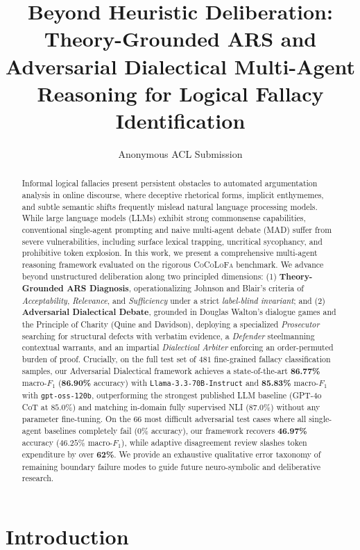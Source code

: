 \documentclass[11pt]{article}
\title{Beyond Heuristic Deliberation: Theory-Grounded ARS and Adversarial Dialectical Multi-Agent Reasoning for Logical Fallacy Identification}
\author{Anonymous ACL Submission}
\begin{document}
\maketitle

\begin{abstract}
Informal logical fallacies present persistent obstacles to automated argumentation analysis in online discourse, where deceptive rhetorical forms, implicit enthymemes, and subtle semantic shifts frequently mislead natural language processing models. While large language models (LLMs) exhibit strong commonsense capabilities, conventional single-agent prompting and naive multi-agent debate (MAD) suffer from severe vulnerabilities, including surface lexical trapping, uncritical sycophancy, and prohibitive token explosion. In this work, we present a comprehensive multi-agent reasoning framework evaluated on the rigorous \textsc{CoCoLoFa} benchmark. We advance beyond unstructured deliberation along two principled dimensions: (1) \textbf{Theory-Grounded ARS Diagnosis}, operationalizing Johnson and Blair's criteria of \textit{Acceptability}, \textit{Relevance}, and \textit{Sufficiency} under a strict \textit{label-blind invariant}; and (2) \textbf{Adversarial Dialectical Debate}, grounded in Douglas Walton's dialogue games and the Principle of Charity (Quine and Davidson), deploying a specialized \textit{Prosecutor} searching for structural defects with verbatim evidence, a \textit{Defender} steelmanning contextual warrants, and an impartial \textit{Dialectical Arbiter} enforcing an order-permuted burden of proof. Crucially, on the full test set of $481$ fine-grained fallacy classification samples, our Adversarial Dialectical framework achieves a state-of-the-art \textbf{86.77\%} macro-$F_1$ (\textbf{86.90\%} accuracy) with \texttt{Llama-3.3-70B-Instruct} and \textbf{85.83\%} macro-$F_1$ with \texttt{gpt-oss-120b}, outperforming the strongest published LLM baseline (GPT-4o CoT at $85.0\%$) and matching in-domain fully supervised NLI ($87.0\%$) without any parameter fine-tuning. On the $66$ most difficult adversarial test cases where all single-agent baselines completely fail ($0\%$ accuracy), our framework recovers \textbf{46.97\%} accuracy ($46.25\%$ macro-$F_1$), while adaptive disagreement review slashes token expenditure by over \textbf{62\%}. We provide an exhaustive qualitative error taxonomy of remaining boundary failure modes to guide future neuro-symbolic and deliberative research.
\end{abstract}

\section{Introduction}
\end{document}
